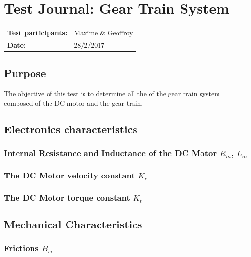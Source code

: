 \graphicspath{{figures/appendix/}}
\chapter{Test Journal: Gear Train System}\label{appendix:DCMotorInductance}
\begin{table}[htbp]
\begin{tabular}{l l}
\textbf{Test participants:} & Maxime \& Geoffroy  \\
\textbf{Date:}  & 28/2/2017
\end{tabular}
\end{table}

\section*{Purpose}
The objective of this test is to determine all the of the gear train system composed of the DC motor and the gear train.
\section*{Electronics characteristics}

\subsection*{Internal Resistance and Inductance of the DC Motor $R_m$, $L_m$}


\subsection{The DC Motor velocity constant $K_e$}



\subsection{The DC Motor torque constant $K_t$}


\section{Mechanical Characteristics}

\subsection{Frictions $B_m$}


